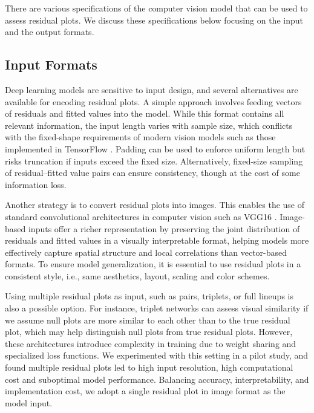 \documentclass[]{interact}
\theoremstyle{plain}%
\theoremstyle{definition}
\theoremstyle{remark}
\begin{document}
There are various specifications of the computer vision model that can
be used to assess residual plots. We discuss these specifications below
focusing on the input and the output formats.

\subsection{Input Formats}\label{input-formats}

Deep learning models are sensitive to input design, and several
alternatives are available for encoding residual plots. A simple
approach involves feeding vectors of residuals and fitted values into
the model. While this format contains all relevant information, the
input length varies with sample size, which conflicts with the
fixed-shape requirements of modern vision models such as those
implemented in TensorFlow \citep{abadi2016tensorflow}. Padding can be
used to enforce uniform length but risks truncation if inputs exceed the
fixed size. Alternatively, fixed-size sampling of residual--fitted value
pairs can ensure consistency, though at the cost of some information
loss.

Another strategy is to convert residual plots into images. This enables
the use of standard convolutional architectures in computer vision such
as VGG16 \citep{simonyan2014very}. Image-based inputs offer a richer
representation by preserving the joint distribution of residuals and
fitted values in a visually interpretable format, helping models more
effectively capture spatial structure and local correlations than
vector-based formats. To ensure model generalization, it is essential to
use residual plots in a consistent style, i.e., same aesthetics, layout,
scaling and color schemes.

Using multiple residual plots as input, such as pairs, triplets, or full
lineups is also a possible option. For instance, triplet networks
\citep{chopra2005learning} can assess visual similarity if we assume
null plots are more similar to each other than to the true residual
plot, which may help distinguish null plots from true residual plots.
However, these architectures introduce complexity in training due to
weight sharing and specialized loss functions. We experimented with this
setting in a pilot study, and found multiple residual plots led to high
input resolution, high computational cost and suboptimal model
performance. Balancing accuracy, interpretability, and implementation
cost, we adopt a single residual plot in image format as the model
input.
\end{document}
